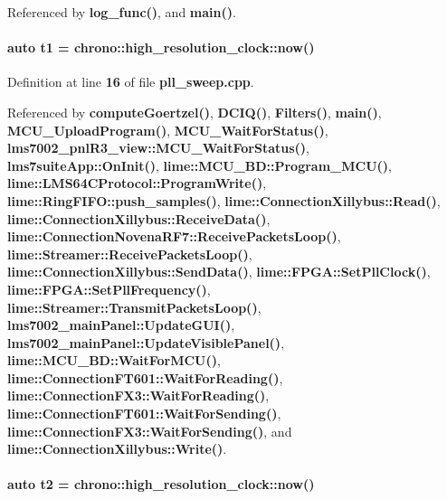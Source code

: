 Referenced by {\bf log\+\_\+func()}, and {\bf main()}.

\paragraph[{t1}]{\setlength{\rightskip}{0pt plus 5cm}auto t1 = chrono\+::high\+\_\+resolution\+\_\+clock\+::now()}\label{pll__sweep_8cpp_ae2ca95b0071a009a78ce4339b81fdd36}


Definition at line {\bf 16} of file {\bf pll\+\_\+sweep.\+cpp}.



Referenced by {\bf compute\+Goertzel()}, {\bf D\+C\+I\+Q()}, {\bf Filters()}, {\bf main()}, {\bf M\+C\+U\+\_\+\+Upload\+Program()}, {\bf M\+C\+U\+\_\+\+Wait\+For\+Status()}, {\bf lms7002\+\_\+pnl\+R3\+\_\+view\+::\+M\+C\+U\+\_\+\+Wait\+For\+Status()}, {\bf lms7suite\+App\+::\+On\+Init()}, {\bf lime\+::\+M\+C\+U\+\_\+\+B\+D\+::\+Program\+\_\+\+M\+C\+U()}, {\bf lime\+::\+L\+M\+S64\+C\+Protocol\+::\+Program\+Write()}, {\bf lime\+::\+Ring\+F\+I\+F\+O\+::push\+\_\+samples()}, {\bf lime\+::\+Connection\+Xillybus\+::\+Read()}, {\bf lime\+::\+Connection\+Xillybus\+::\+Receive\+Data()}, {\bf lime\+::\+Connection\+Novena\+R\+F7\+::\+Receive\+Packets\+Loop()}, {\bf lime\+::\+Streamer\+::\+Receive\+Packets\+Loop()}, {\bf lime\+::\+Connection\+Xillybus\+::\+Send\+Data()}, {\bf lime\+::\+F\+P\+G\+A\+::\+Set\+Pll\+Clock()}, {\bf lime\+::\+F\+P\+G\+A\+::\+Set\+Pll\+Frequency()}, {\bf lime\+::\+Streamer\+::\+Transmit\+Packets\+Loop()}, {\bf lms7002\+\_\+main\+Panel\+::\+Update\+G\+U\+I()}, {\bf lms7002\+\_\+main\+Panel\+::\+Update\+Visible\+Panel()}, {\bf lime\+::\+M\+C\+U\+\_\+\+B\+D\+::\+Wait\+For\+M\+C\+U()}, {\bf lime\+::\+Connection\+F\+T601\+::\+Wait\+For\+Reading()}, {\bf lime\+::\+Connection\+F\+X3\+::\+Wait\+For\+Reading()}, {\bf lime\+::\+Connection\+F\+T601\+::\+Wait\+For\+Sending()}, {\bf lime\+::\+Connection\+F\+X3\+::\+Wait\+For\+Sending()}, and {\bf lime\+::\+Connection\+Xillybus\+::\+Write()}.

\paragraph[{t2}]{\setlength{\rightskip}{0pt plus 5cm}auto t2 = chrono\+::high\+\_\+resolution\+\_\+clock\+::now()}\label{pll__sweep_8cpp_a0919167e1fe8808c6ede9a583b3e2762}


